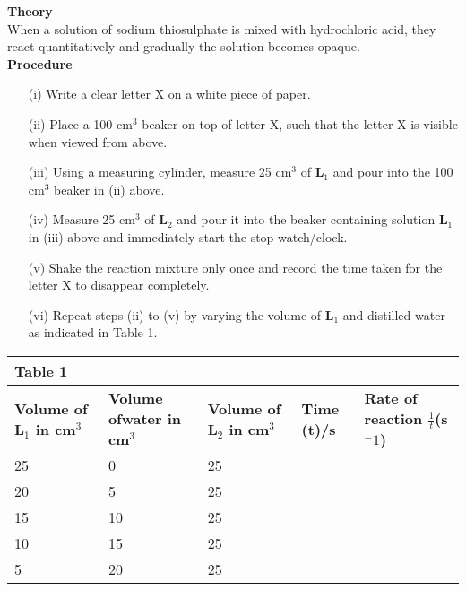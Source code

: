 \begin{enumerate}
\textbf{Theory}\\
When a solution of sodium thiosulphate is mixed with hydrochloric acid, they react quantitatively and gradually the solution becomes opaque.\\

\textbf{Procedure}\\
\vspace{-6pt}
\begin{enumerate}
\item[(i)] Write a clear letter X on a white piece of paper.
\item[(ii)] Place a 100 cm$^3$ beaker on top of letter X, such that the letter X is visible when viewed from above.
\item[(iii)] Using a measuring cylinder, measure 25 cm$^3$ of \textbf{L$_1$} and pour into the 100 cm$^3$ beaker in (ii) above.
\item[(iv)] Measure 25 cm$^3$ of \textbf{L$_2$} and pour it into the beaker containing solution \textbf{L$_1$} in (iii) above and immediately start the stop watch/clock.
\item[(v)] Shake the reaction mixture only once and record the time taken for the letter X to disappear completely.
\item[(vi)] Repeat steps (ii) to (v) by varying the volume of \textbf{L$_1$} and distilled water as indicated in Table 1.
\end{enumerate}

\newpage

\begin{center}
\begin{tabular}{|p{2.5cm}|p{2.5cm}|p{2.5cm}|p{2cm}|p{4cm}|}
\multicolumn{1}{l}{Table 1}&\multicolumn{1}{l}{ }&\multicolumn{1}{l}{ }\\ \hline
\textbf{Volume of \textbf{L$_1$} in cm$^3$}&\textbf{Volume of\newline water in cm$^3$}&\textbf{Volume of \textbf{L$_2$} in cm$^3$}&\textbf{Time (t)/s}&\textbf{Rate of reaction $\frac{1}{t}$(s$^-1$)}\\ \hline
25&0&25&&\\ \hline
20&5&25&&\\ \hline
15&10&25&&\\ \hline
10&15&25&&\\ \hline
5&20&25&&\\ \hline
\end{tabular}
\end{center}


\end{enumerate}
